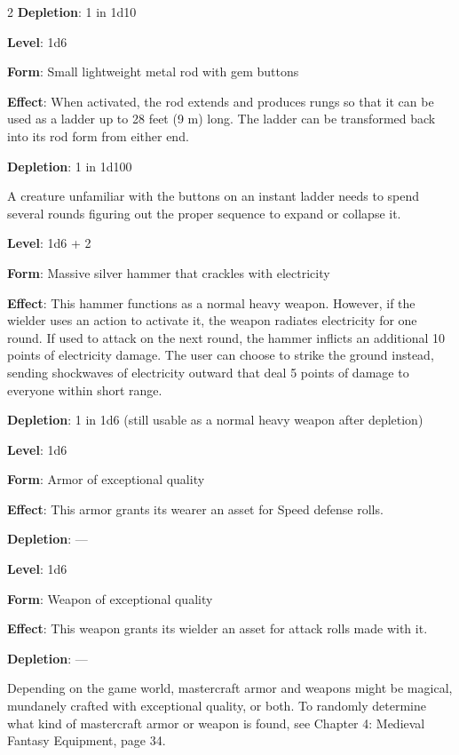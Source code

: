 \begin{multicols}{2}
\textbf{Depletion}: 1 in 1d10


\textbf{Level}: 1d6 

\textbf{Form}: Small lightweight metal rod with gem buttons 

\textbf{Effect}: When activated, the rod extends and produces rungs so that it can be used as a ladder up to 28 feet (9 m) long. The ladder can be transformed back into its rod form from either end. 

\textbf{Depletion}: 1 in 1d100 

A creature unfamiliar with the buttons on an instant ladder needs to spend several rounds figuring out the proper sequence to expand or collapse it.


\textbf{Level}: 1d6 + 2 

\textbf{Form}: Massive silver hammer that crackles with electricity 

\textbf{Effect}: This hammer functions as a normal heavy weapon. However, if the wielder uses an action to activate it, the weapon radiates electricity for one round. If used to attack on the next round, the hammer inflicts an additional 10 points of electricity damage. The user can choose to strike the ground instead, sending shockwaves of electricity outward that deal 5 points of damage to everyone within short range. 

\textbf{Depletion}: 1 in 1d6 (still usable as a normal heavy weapon after depletion)


\textbf{Level}: 1d6 

\textbf{Form}: Armor of exceptional quality 

\textbf{Effect}: This armor grants its wearer an asset for Speed defense rolls. 

\textbf{Depletion}: — 


\textbf{Level}: 1d6 

\textbf{Form}: Weapon of exceptional quality 

\textbf{Effect}: This weapon grants its wielder an asset for attack rolls made with it. 

\textbf{Depletion}: — 

Depending on the game world, mastercraft armor and weapons might be magical, mundanely crafted with exceptional quality, or both. To randomly determine what kind of mastercraft armor or weapon is found, see Chapter 4: Medieval Fantasy Equipment, page 34.


\end{multicols}

